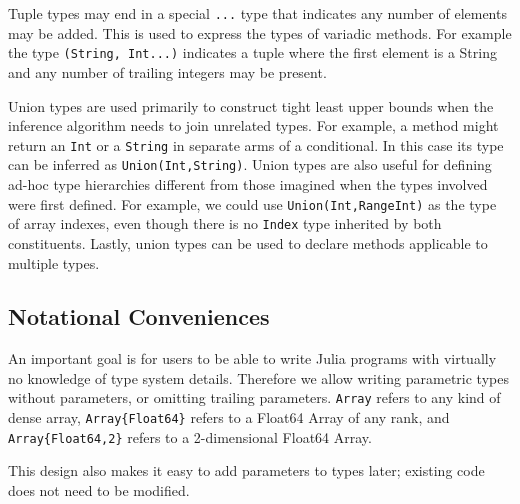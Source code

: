 \documentclass[9pt]{sigplanconf}
\begin{document}
Tuple types may end in a special {\tt ...} type that
indicates any number of elements may be added. This is used to express the
types of variadic methods. For example the type {\tt (String, Int...)}
indicates a tuple where the first element is a String and any number of
trailing integers may be present.

Union types are used primarily to construct tight least upper bounds
when the inference algorithm needs to join unrelated types. For example,
a method might return an {\tt Int} or a {\tt String} in separate
arms of a conditional. In this case its type can be inferred as
{\tt Union(Int,String)}. Union types are also useful for defining
ad-hoc type hierarchies different from those imagined when the types
involved were first defined. For example, we could use
{\tt Union(Int,Range{Int})} as the type of array indexes, even though
there is no {\tt Index} type inherited by both constituents. Lastly,
union types can be used to declare methods applicable to multiple types.


\subsection{Notational Conveniences}

An important goal is for users to be able to write Julia programs with
virtually no knowledge of type system details. Therefore we allow writing
parametric types without parameters, or omitting trailing parameters.
{\tt Array} refers to any kind of dense array, {\tt Array\{Float64\}} refers
to a Float64 Array of any rank, and {\tt Array\{Float64,2\}} refers to a
2-dimensional Float64 Array.

This design also makes it easy to add parameters to types later; existing
code does not need to be modified.

\end{document}
